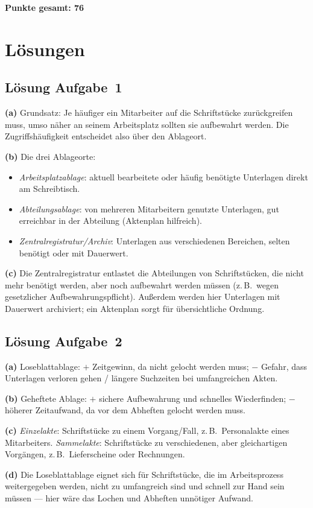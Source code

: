 \documentclass[11pt, a4paper]{article}
\begin{document}
\vspace{1em}
\noindent\textbf{Punkte gesamt: 76}

\newpage

\section{Lösungen}\label{loesungen}

\subsection*{Lösung Aufgabe~1}
\begin{loesung}
\textbf{(a)} Grundsatz: Je häufiger ein Mitarbeiter auf die Schriftstücke zurückgreifen
muss, umso näher an seinem Arbeitsplatz sollten sie aufbewahrt werden. Die
Zugriffshäufigkeit entscheidet also über den Ablageort.

\textbf{(b)} Die drei Ablageorte:
\begin{itemize}[itemsep=0pt]
  \item \emph{Arbeitsplatzablage}: aktuell bearbeitete oder häufig benötigte Unterlagen direkt am Schreibtisch.
  \item \emph{Abteilungsablage}: von mehreren Mitarbeitern genutzte Unterlagen, gut erreichbar in der Abteilung (Aktenplan hilfreich).
  \item \emph{Zentralregistratur/Archiv}: Unterlagen aus verschiedenen Bereichen, selten benötigt oder mit Dauerwert.
\end{itemize}

\textbf{(c)} Die Zentralregistratur entlastet die Abteilungen von Schriftstücken, die
nicht mehr benötigt werden, aber noch aufbewahrt werden müssen (z.\,B.\ wegen
gesetzlicher Aufbewahrungspflicht). Außerdem werden hier Unterlagen mit Dauerwert
archiviert; ein Aktenplan sorgt für übersichtliche Ordnung.
\end{loesung}

\subsection*{Lösung Aufgabe~2}
\begin{loesung}
\textbf{(a)} Loseblattablage: $+$ Zeitgewinn, da nicht gelocht werden muss; $-$ Gefahr,
dass Unterlagen verloren gehen / längere Suchzeiten bei umfangreichen Akten.

\textbf{(b)} Geheftete Ablage: $+$ sichere Aufbewahrung und schnelles Wiederfinden;
$-$ höherer Zeitaufwand, da vor dem Abheften gelocht werden muss.

\textbf{(c)} \emph{Einzelakte}: Schriftstücke zu einem Vorgang/Fall, z.\,B.\ Personalakte
eines Mitarbeiters. \emph{Sammelakte}: Schriftstücke zu verschiedenen, aber
gleichartigen Vorgängen, z.\,B.\ Lieferscheine oder Rechnungen.

\textbf{(d)} Die Loseblattablage eignet sich für Schriftstücke, die im Arbeitsprozess
weitergegeben werden, nicht zu umfangreich sind und schnell zur Hand sein müssen --- hier
wäre das Lochen und Abheften unnötiger Aufwand.
\end{loesung}
\end{document}
